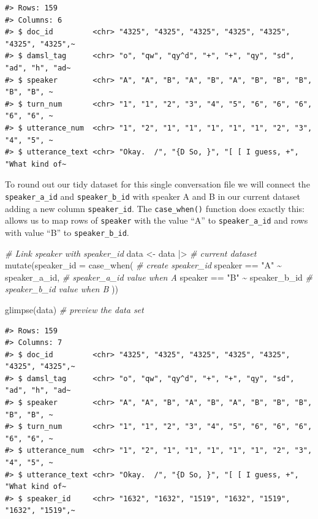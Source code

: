 \documentclass[
  letterpaper,
]{scrbook}
\newenvironment{Shaded}{\begin{snugshade}}{\end{snugshade}}
\newcommand{\AttributeTok}[1]{\textcolor[rgb]{0.00,0.00,0.00}{#1}}
\newcommand{\CommentTok}[1]{\textcolor[rgb]{0.00,0.00,0.00}{\textit{#1}}}
\newcommand{\FunctionTok}[1]{\textcolor[rgb]{0.00,0.00,0.00}{#1}}
\newcommand{\NormalTok}[1]{\textcolor[rgb]{0.00,0.00,0.00}{#1}}
\newcommand{\OtherTok}[1]{\textcolor[rgb]{0.00,0.00,0.00}{#1}}
\newcommand{\SpecialCharTok}[1]{\textcolor[rgb]{0.00,0.00,0.00}{#1}}
\newcommand{\StringTok}[1]{\textcolor[rgb]{0.00,0.00,0.00}{#1}}
\begin{document}
\begin{verbatim}
#> Rows: 159
#> Columns: 6
#> $ doc_id         <chr> "4325", "4325", "4325", "4325", "4325", "4325", "4325",~
#> $ damsl_tag      <chr> "o", "qw", "qy^d", "+", "+", "qy", "sd", "ad", "h", "ad~
#> $ speaker        <chr> "A", "A", "B", "A", "B", "A", "B", "B", "B", "B", "B", ~
#> $ turn_num       <chr> "1", "1", "2", "3", "4", "5", "6", "6", "6", "6", "6", ~
#> $ utterance_num  <chr> "1", "2", "1", "1", "1", "1", "1", "2", "3", "4", "5", ~
#> $ utterance_text <chr> "Okay.  /", "{D So, }", "[ [ I guess, +", "What kind of~
\end{verbatim}

To round out our tidy dataset for this single conversation file we will
connect the \texttt{speaker\_a\_id} and \texttt{speaker\_b\_id} with
speaker A and B in our current dataset adding a new column
\texttt{speaker\_id}. The \texttt{case\_when()} function does exactly
this: allows us to map rows of \texttt{speaker} with the value ``A'' to
\texttt{speaker\_a\_id} and rows with value ``B'' to
\texttt{speaker\_b\_id}.

\begin{Shaded}
\begin{Highlighting}[]
\CommentTok{\# Link speaker with speaker\_id}
\NormalTok{data }\OtherTok{\textless{}{-}} 
\NormalTok{  data }\SpecialCharTok{|\textgreater{}} \CommentTok{\# current dataset}
  \FunctionTok{mutate}\NormalTok{(}\AttributeTok{speaker\_id =} \FunctionTok{case\_when}\NormalTok{( }\CommentTok{\# create speaker\_id}
\NormalTok{    speaker }\SpecialCharTok{==} \StringTok{"A"} \SpecialCharTok{\textasciitilde{}}\NormalTok{ speaker\_a\_id, }\CommentTok{\# speaker\_a\_id value when A}
\NormalTok{    speaker }\SpecialCharTok{==} \StringTok{"B"} \SpecialCharTok{\textasciitilde{}}\NormalTok{ speaker\_b\_id }\CommentTok{\# speaker\_b\_id value when B}
\NormalTok{  ))}

\FunctionTok{glimpse}\NormalTok{(data) }\CommentTok{\# preview the data set}
\end{Highlighting}
\end{Shaded}

\begin{verbatim}
#> Rows: 159
#> Columns: 7
#> $ doc_id         <chr> "4325", "4325", "4325", "4325", "4325", "4325", "4325",~
#> $ damsl_tag      <chr> "o", "qw", "qy^d", "+", "+", "qy", "sd", "ad", "h", "ad~
#> $ speaker        <chr> "A", "A", "B", "A", "B", "A", "B", "B", "B", "B", "B", ~
#> $ turn_num       <chr> "1", "1", "2", "3", "4", "5", "6", "6", "6", "6", "6", ~
#> $ utterance_num  <chr> "1", "2", "1", "1", "1", "1", "1", "2", "3", "4", "5", ~
#> $ utterance_text <chr> "Okay.  /", "{D So, }", "[ [ I guess, +", "What kind of~
#> $ speaker_id     <chr> "1632", "1632", "1519", "1632", "1519", "1632", "1519",~
\end{verbatim}
\end{document}
